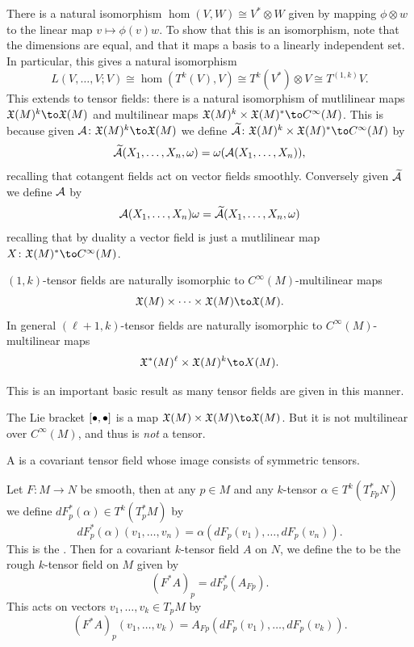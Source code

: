 There is a natural isomorphism $\hom(V,W)\cong V^*\otimes W$ given by mapping $\phi\otimes w$ to the linear map
$v\mapsto\phi(v)w$.
To show that this is an isomorphism, note that the dimensions are equal, and that it maps a basis to a linearly independent
set.
In particular, this gives a natural isomorphism
$$ L(V,\dots,V;V) \cong \hom(T^k(V),V) \cong T^k(V^*)\otimes V \cong T^{(1,k)}V . $$
This extends to tensor fields: there is a natural isomorphism of mutlilinear maps $\X(M)^k\to\X(M)$ and multilinear maps
$\X(M)^k\times\X(M)^*\to C^\infty(M)$.
This is because given $\A\colon\X(M)^k\to\X(M)$ we define $\tilde\A\colon\X(M)^k\times\X(M)^*\to C^\infty(M)$ by
$$ \widetilde{{{\cal A}}}(X_1,\dots,X_n,\omega) = \omega({{\cal A}}(X_1,\dots,X_n)) , $$
recalling that cotangent fields act on vector fields smoothly.
Conversely given $\widetilde{{{\cal A}}}$ we define ${{\cal A}}$ by
$$ {{\cal A}}(X_1,\dots,X_n)\omega = \widetilde{{{\cal A}}}(X_1,\dots,X_n,\omega) $$
recalling that by duality a vector field is just a mutlilinear map $X\colon\X(M)^*\to C^\infty(M)$.

\bprop

    $(1,k)$-tensor fields are naturally isomorphic to $C^\infty(M)$-multilinear maps
    $$ \X(M)\times\cdots\times\X(M)\to\X(M) . $$
    In general $(\ell+1,k)$-tensor fields are naturally isomorphic to $C^\infty(M)$-multilinear maps
    $$ \X^*(M)^\ell\times\X(M)^k \to X(M) . $$

\eprop

This is an important basic result as many tensor fields are given in this manner.

\bexam

    The Lie bracket $[\bullet,\bullet]$ is a map $\X(M)\times\X(M)\to\X(M)$.
    But it is not multilinear over $C^\infty(M)$, and thus is {\it not\/} a tensor.

\eexam

\bdefn

    A  is a covariant tensor field whose image consists of symmetric tensors.

\edefn

\bdefn

    Let $F\colon M\to N$ be smooth, then at any $p\in M$ and any $k$-tensor $\alpha\in T^k(T^*_{Fp}N)$ we define $dF^*_p(\alpha)\in T^k(T^*_pM)$ by
    $$ dF^*_p(\alpha)(v_1,\dots,v_n) = \alpha(dF_p(v_1),\dots,dF_p(v_n)) . $$
    This is the .
    Then for a covariant $k$-tensor field $A$ on $N$, we define the  to be the rough $k$-tensor field on $M$ given by
    $$ (F^*A)_p = dF^*_p(A_{Fp}) . $$
    This acts on vectors $v_1,\dots,v_k\in T_pM$ by
    $$ (F^*A)_p(v_1,\dots,v_k) = A_{Fp}(dF_p(v_1),\dots,dF_p(v_k)) . $$

